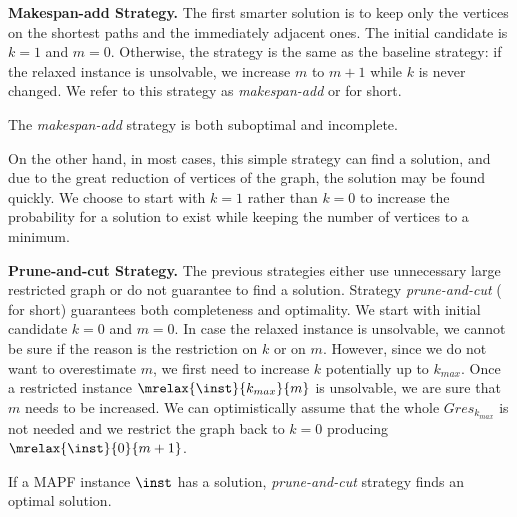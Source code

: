 \textbf{Makespan-add Strategy.}
%
The first smarter solution is to keep only the vertices on the shortest paths and the immediately adjacent ones. The initial candidate is $k=1$ and $m=0$. Otherwise, the strategy is the same as the baseline strategy: if the relaxed instance is unsolvable, we increase $m$ to $m+1$ while $k$ is never changed. We refer to this strategy as \emph{makespan-add} or \ssm{} for short.
%
\begin{prop}\cite{AAMAS_corridors}
The \emph{makespan-add} strategy is both suboptimal and incomplete.
\end{prop}
%
%
%
On the other hand, in most cases, this simple strategy can find a solution, and due to the great reduction of vertices of the graph, the solution may be found quickly. We choose to start with $k=1$ rather than $k=0$ to increase the probability for a solution to exist while keeping the number of vertices to a minimum.
%

\textbf{Prune-and-cut Strategy.}
%
The previous strategies either use unnecessary large restricted graph or do not guarantee to find a solution. Strategy \emph{prune-and-cut} (\ssp{} for short) guarantees both completeness and optimality. We start with initial candidate $k=0$ and $m=0$. In case the relaxed instance is unsolvable, we cannot be sure if the reason is the restriction on $k$ or on $m$. However, since we do not want to overestimate $m$, we first need to increase $k$ potentially up to $k_{max}$. Once a restricted instance $\mrelax{\inst}{k_{max}}{m}$ is unsolvable, we are sure that $m$ needs to be increased. %
We can optimistically assume that the whole $\mathit{Gres}_{k_{max}}$ is not needed and we restrict the graph back to $k=0$ producing $\mrelax{\inst}{0}{m+1}$.
%
\begin{prop}\cite{AAMAS_corridors}
If a MAPF instance $\inst$ has a solution, \emph{prune-and-cut} strategy finds an optimal solution.
\end{prop}

